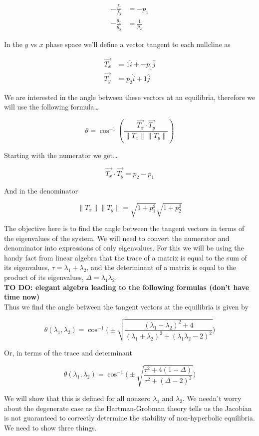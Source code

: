 \documentclass{article}
\begin{document}
\begin{align}
-\frac{f_x}{f_y} &= -p_1 \\
-\frac{g_x}{g_y} &= \frac{1}{p_2}
\end{align}

In the $y$ vs $x$ phase space we'll define a vector tangent to each
nullcline as

\begin{align}
\vec{T_x} &= 1\hat{i} + -p_1\hat{j} \\
\vec{T_y} &= p_2\hat{i} + 1\hat{j} 
\end{align}

We are interested in the angle between these vectors at an equilibria,
therefore we will use the following formula\ldots{}

\[\theta = \cos^{-1}(\frac{\vec{T_x}\cdot \vec{T_y}}{\|T_x\| \|T_y\|})\]

Starting with the numerator we get\ldots{}

\[\vec{T_x}\cdot \vec{T_y} = p_2-p_1\]

And in the denominator

\[\|T_x\| \|T_y\| = \sqrt{1+p^2_1}\sqrt{1+p^2_2}\]

The objective here is to find the angle between the tangent vectors in
terms of the eigenvalues of the system. We will need to convert the
numerator and denominator into expressions of only eigenvalues. For this
we will be using the handy fact from linear algebra that the trace of a
matrix is equal to the sum of its eigenvalues,
$\tau=\lambda_1+\lambda_2$, and the determinant of a matrix is equal to
the product of its eigenvalues, $\Delta = \lambda_1 \lambda_2$. \\

\textbf{TO DO: elegant algebra leading to the following formulas (don't
have time now)} \\

Thus we find the angle between the tangent vectors at the equilibria is
given by

\[\theta(\lambda_1,\lambda_2) = \cos^{-1}\Bigg (\pm \sqrt{\frac{(\lambda_1-\lambda_2)^2+4}{(\lambda_1+\lambda_2)^2+(\lambda_1 \lambda_2-2)^2}}\Bigg )\]

Or, in terms of the trace and determinant

\[\theta(\lambda_1,\lambda_2) = \cos^{-1}\Bigg (\pm \sqrt{\frac{\tau^2+4(1-\Delta)}{\tau^2+(\Delta-2)^2}}\Bigg )\]

We will show that this is defined for all nonzero $\lambda_1$ and
$\lambda_2$. We needn't worry about the degenerate case as the
Hartman-Grobman theory tells us the Jacobian is not guaranteed to
correctly determine the stability of non-hyperbolic equilibria. We need
to show three things.
\end{document}
